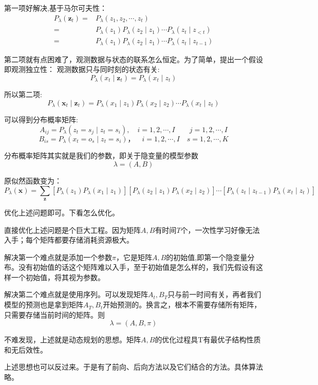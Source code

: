 \documentclass{article}
\begin{document}
        第一项好解决,基于马尔可夫性：
        \begin{align*}
            P_\lambda(\boldsymbol{z}_t)=&P_\lambda(z_1,z_2,\cdots,z_t)\\
            =&P_\lambda(z_1)P_\lambda(z_2\mid z_1)\cdots P_\lambda(z_t\mid z_{<t})\\
            =&P_\lambda(z_1)P_\lambda(z_2\mid z_1)\cdots P_\lambda(z_t\mid z_{t-1})
        \end{align*}

        第二项就有点困难了，观测数据与状态的联系怎么恒定。为了简单，提出一个假设即观测独立性：
        观测数据只与同时刻的状态有关:
        \[P_\lambda(x_t\mid \boldsymbol{z}_t)=P_\lambda(x_t\mid z_t)\]

        所以第二项:
        \[P_\lambda(\boldsymbol{x}_t\mid\boldsymbol{z}_t)=P_\lambda(x_1\mid z_1)P_\lambda(x_2\mid z_2)\cdots P_\lambda(x_t\mid z_t)\]

        可以得到分布概率矩阵:
        \[A_{ij}=P_\lambda(z_{t}=s_j\mid z_t=s_i),\quad i=1,2,\cdots,I\quad \quad j=1,2,\cdots,I\]
        \[B_{is}=P_\lambda(x_t=o_s\mid z_t=s_i)，\quad i=1,2,\cdots,I\quad s=1,2,\cdots,K\]

        分布概率矩阵其实就是我们的参数，即关于隐变量的模型参数
        \[\lambda=(A,B)\]

        原似然函数变为：
        \[P_\lambda(\boldsymbol{x})=\sum_{\boldsymbol{z}}[P_\lambda(z_1)P_\lambda(x_1\mid z_1)][P_\lambda(z_2 \mid z_1)P_\lambda(x_2\mid z_2)]\cdots[P_\lambda(z_t\mid z_{t-1})P_\lambda(x_t\mid z_t)]\]

        优化上述问题即可。下看怎么优化。

        直接优化上述问题是个巨大工程。因为矩阵$A,B$有时间$T$个，一次性学习好像无法入手；每个矩阵都要存储消耗资源极大。

        解决第一个难点就是添加一个参数$\pi$，它是矩阵$A,B$的初始值,即第一个隐变量分布。没有初始值的话这个矩阵难以入手，至于初始值是怎么样的，我们先假设有这样一个初始值，将其视为参数。

        解决第二个难点就是使用序列。可以发现矩阵$A_t,B_T$只与前一时间有关，再者我们模型的预测也是拿到矩阵$A_T,B_t$开始预测的。换言之，根本不需要存储所有矩阵，只需要存储当前时间的矩阵。则
        \[\lambda=(A,B,\pi)\]

        不难发现，上述就是动态规划的思想。矩阵$A,B$的优化过程具T有最优子结构性质和无后效性。

        上述思想也可以反过来。于是有了前向、后向方法以及它们结合的方法。具体算法略。
\end{document}
